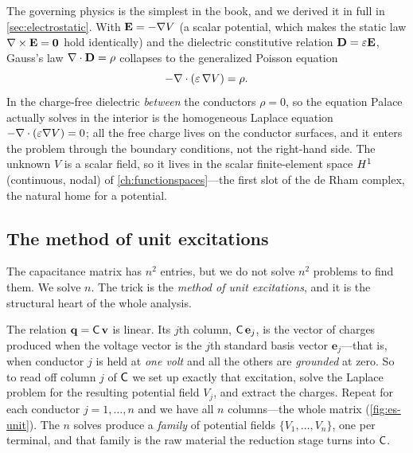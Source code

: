 The governing physics is the simplest in the book, and we derived it in full in
\cref{sec:electrostatic}. With $\mathbf{E}=-\nabla V$ (a scalar potential, which makes the
static law $\nabla\times\mathbf{E}=\mathbf0$ hold identically) and the dielectric constitutive
relation $\mathbf{D}=\varepsilon\mathbf{E}$, Gauss's law $\nabla\cdot\mathbf{D}=\rho$ collapses to the
generalized Poisson equation
\begin{equation}
  -\nabla\cdot(\varepsilon\,\nabla V) = \rho .
  \label{eq:es-poisson-ch39}
\end{equation}
In the charge-free dielectric \emph{between} the conductors $\rho=0$, so the
equation Palace actually solves in the interior is the homogeneous Laplace
equation $-\nabla\cdot(\varepsilon\nabla V)=0$; all the free charge lives on the conductor
surfaces, and it enters the problem through the boundary conditions, not the
right-hand side. The unknown $V$ is a scalar field, so it lives in the scalar
finite-element space $H^1$ (continuous, nodal) of \cref{ch:functionspaces}---the
first slot of the de Rham complex, the natural home for a potential.

\subsection{The method of unit excitations}
\label{sec:unit-excitations}

The capacitance matrix has $n^2$ entries, but we do not solve $n^2$ problems to
find them. We solve $n$. The trick is the \emph{method of unit excitations}, and
it is the structural heart of the whole analysis.

The relation $\mathbf q=\mathsf{C}\,\mathbf v$ is linear. Its $j$th column,
$\mathsf{C}\,\mathbf e_j$, is the vector of charges produced when the voltage vector
is the $j$th standard basis vector $\mathbf e_j$---that is, when conductor $j$ is
held at \emph{one volt} and all the others are \emph{grounded} at zero. So to read
off column $j$ of $\mathsf{C}$ we set up exactly that excitation, solve the Laplace
problem for the resulting potential field $V_j$, and extract the charges. Repeat
for each conductor $j=1,\dots,n$ and we have all $n$ columns---the whole matrix
(\cref{fig:es-unit}). The $n$ solves produce a \emph{family} of potential fields
$\{V_1,\dots,V_n\}$, one per terminal, and that family is the raw material the
reduction stage turns into $\mathsf{C}$.

